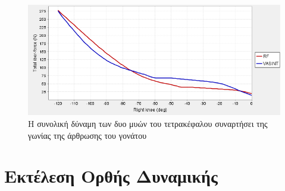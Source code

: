 \begin{figure}[H]
    \centering
    \includegraphics[width=0.8\linewidth, keepaspectratio]{fig/total-fiber-force.png}
    \caption{Η συνολική δύναμη των δυο μυών του τετρακέφαλου συναρτήσει της γωνίας της άρθρωσης του γονάτου}
    \label{fig:total-fiber-force}
\end{figure}

\section{Εκτέλεση Ορθής Δυναμικής}

